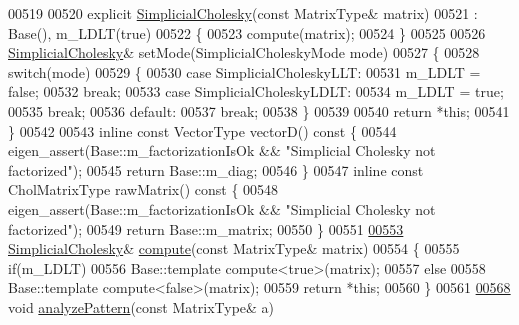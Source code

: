 \begin{DoxyCode}
00519 
00520     \textcolor{keyword}{explicit} \hyperlink{group___sparse_cholesky___module_class_eigen_1_1_simplicial_cholesky}{SimplicialCholesky}(\textcolor{keyword}{const} MatrixType& matrix)
00521       : Base(), m\_LDLT(\textcolor{keyword}{true})
00522     \{
00523       compute(matrix);
00524     \}
00525 
00526     \hyperlink{group___sparse_cholesky___module_class_eigen_1_1_simplicial_cholesky}{SimplicialCholesky}& setMode(SimplicialCholeskyMode mode)
00527     \{
00528       \textcolor{keywordflow}{switch}(mode)
00529       \{
00530       \textcolor{keywordflow}{case} SimplicialCholeskyLLT:
00531         m\_LDLT = \textcolor{keyword}{false};
00532         \textcolor{keywordflow}{break};
00533       \textcolor{keywordflow}{case} SimplicialCholeskyLDLT:
00534         m\_LDLT = \textcolor{keyword}{true};
00535         \textcolor{keywordflow}{break};
00536       \textcolor{keywordflow}{default}:
00537         \textcolor{keywordflow}{break};
00538       \}
00539 
00540       \textcolor{keywordflow}{return} *\textcolor{keyword}{this};
00541     \}
00542 
00543     \textcolor{keyword}{inline} \textcolor{keyword}{const} VectorType vectorD()\textcolor{keyword}{ const }\{
00544         eigen\_assert(Base::m\_factorizationIsOk && \textcolor{stringliteral}{"Simplicial Cholesky not factorized"});
00545         \textcolor{keywordflow}{return} Base::m\_diag;
00546     \}
00547     \textcolor{keyword}{inline} \textcolor{keyword}{const} CholMatrixType rawMatrix()\textcolor{keyword}{ const }\{
00548         eigen\_assert(Base::m\_factorizationIsOk && \textcolor{stringliteral}{"Simplicial Cholesky not factorized"});
00549         \textcolor{keywordflow}{return} Base::m\_matrix;
00550     \}
00551     
\hyperlink{group___sparse_cholesky___module_a7883b49a88b26162ba6d8b044e2ee75b}{00553}     \hyperlink{group___sparse_cholesky___module_class_eigen_1_1_simplicial_cholesky}{SimplicialCholesky}& \hyperlink{group___sparse_cholesky___module_a7883b49a88b26162ba6d8b044e2ee75b}{compute}(\textcolor{keyword}{const} MatrixType& matrix)
00554     \{
00555       \textcolor{keywordflow}{if}(m\_LDLT)
00556         Base::template compute<true>(matrix);
00557       \textcolor{keywordflow}{else}
00558         Base::template compute<false>(matrix);
00559       \textcolor{keywordflow}{return} *\textcolor{keyword}{this};
00560     \}
00561 
\hyperlink{group___sparse_cholesky___module_a6af3f64b855a96a2635302f863b5fd91}{00568}     \textcolor{keywordtype}{void} \hyperlink{group___sparse_cholesky___module_a6af3f64b855a96a2635302f863b5fd91}{analyzePattern}(\textcolor{keyword}{const} MatrixType& a)

\end{DoxyCode}
